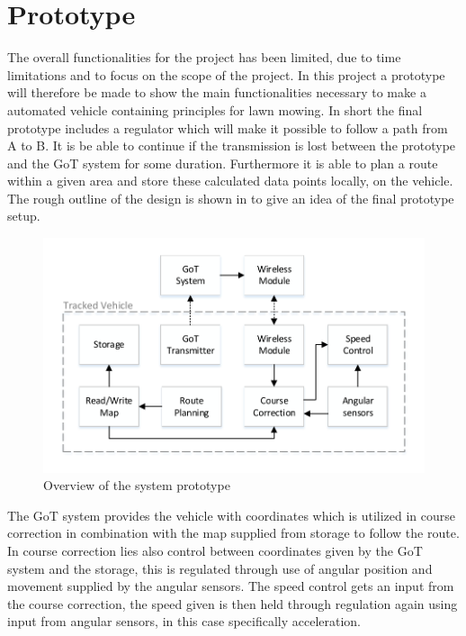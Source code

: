 \section{Prototype}
The overall functionalities for the project has been limited, due to time limitations and to focus on the scope of the project. In this project a prototype will therefore be made to show the main functionalities necessary to make a automated vehicle containing principles for lawn mowing.
In short the final prototype includes a regulator which will make it possible to follow a path from A to B. It is be able to continue if the transmission is lost between the prototype and the GoT system for some duration. Furthermore it is able to plan a route within a given area and store these calculated data points locally, on the vehicle. The rough outline of the design is shown in  to give an idea of the final prototype setup.

\begin{figure}[H]
	\centering
	\includegraphics[scale=.9]{figures/systemOverview1}
	\caption{Overview of the system prototype}
	\label{fig:systemOverview1}
\end{figure}

The GoT system provides the vehicle with coordinates which is utilized in course correction in combination with the map supplied from storage to follow the route. In course correction lies also control between coordinates given by the GoT system and the storage, this is regulated through use of angular position and movement supplied by the angular sensors. The speed control gets an input from the course correction, the speed given is then held through regulation again using input from angular sensors, in this case specifically acceleration.

